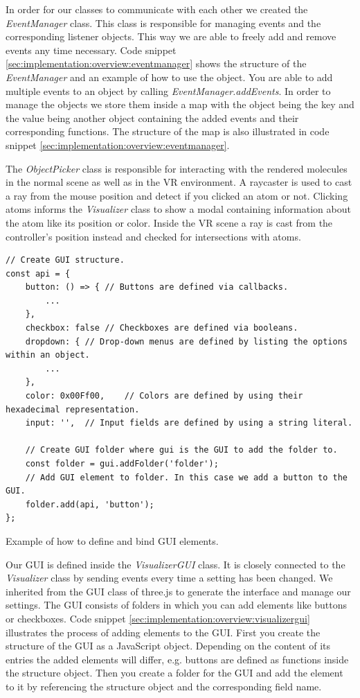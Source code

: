 In order for our classes to communicate with each other we created the \textit{EventManager} class. This class is responsible for managing events and the corresponding listener objects. This way we are able to freely add and remove events any time necessary. Code snippet \ref{sec:implementation:overview:eventmanager} shows the structure of the \textit{EventManager} and an example of how to use the object. You are able to add multiple events to an object by calling \textit{EventManager.addEvents}. In order to manage the objects we store them inside a map with the object being the key and the value being another object containing the added events and their corresponding functions. The structure of the map is also illustrated in code snippet \ref{sec:implementation:overview:eventmanager}.

The \textit{ObjectPicker} class is responsible for interacting with the rendered molecules in the normal scene as well as in the VR environment. A raycaster is used to cast a ray from the mouse position and detect if you clicked an atom or not. Clicking atoms informs the \textit{Visualizer} class to show a modal containing information about the atom like its position or color. Inside the VR scene a ray is cast from the controller's position instead and checked for intersections with atoms.

\begin{listing}[H]
\begin{verbatim}
// Create GUI structure.
const api = {
	button: () => {	// Buttons are defined via callbacks.
		...
	},
	checkbox: false	// Checkboxes are defined via booleans.
	dropdown: {	// Drop-down menus are defined by listing the options within an object.
		...
	},
	color: 0x00Ff00,	// Colors are defined by using their hexadecimal representation.
	input: '',	// Input fields are defined by using a string literal.
	
	// Create GUI folder where gui is the GUI to add the folder to.
	const folder = gui.addFolder('folder');
	// Add GUI element to folder. In this case we add a button to the GUI.
	folder.add(api, 'button');
};
\end{verbatim}
\caption{Example of how to define and bind GUI elements.}
\label{sec:implementation:overview:visualizergui}
\end{listing}

Our GUI is defined inside the \textit{VisualizerGUI} class. It is closely connected to the \textit{Visualizer} class by sending events every time a setting has been changed. We inherited from the GUI class of three.js to generate the interface and manage our settings. The GUI consists of folders in which you can add elements like buttons or checkboxes. Code snippet \ref{sec:implementation:overview:visualizergui} illustrates the process of adding elements to the GUI. First you create the structure of the GUI as a JavaScript object. Depending on the content of its entries the added elements will differ, e.g. buttons are defined as functions inside the structure object. Then you create a folder for the GUI and add the element to it by referencing the structure object and the corresponding field name.

